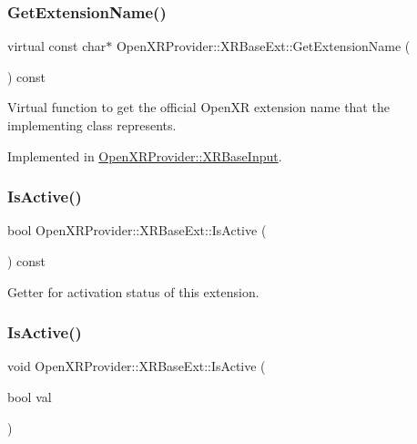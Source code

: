 \subsubsection{\texorpdfstring{GetExtensionName()}{GetExtensionName()}}
{\footnotesize\ttfamily virtual const char$\ast$ Open\+X\+R\+Provider\+::\+X\+R\+Base\+Ext\+::\+Get\+Extension\+Name (\begin{DoxyParamCaption}{ }\end{DoxyParamCaption}) const\hspace{0.3cm}{\ttfamily [pure virtual]}}



Virtual function to get the official Open\+XR extension name that the implementing class represents. 



Implemented in \mbox{\hyperlink{class_open_x_r_provider_1_1_x_r_base_input_a139c33cb927e7b85970d66d35f76e154}{Open\+X\+R\+Provider\+::\+X\+R\+Base\+Input}}.

\mbox{\label{class_open_x_r_provider_1_1_x_r_base_ext_a40bce34f078349e639139ea85b630ac3}} 
\subsubsection{\texorpdfstring{IsActive()}{IsActive()}\hspace{0.1cm}{\footnotesize\ttfamily [1/2]}}
{\footnotesize\ttfamily bool Open\+X\+R\+Provider\+::\+X\+R\+Base\+Ext\+::\+Is\+Active (\begin{DoxyParamCaption}{ }\end{DoxyParamCaption}) const\hspace{0.3cm}{\ttfamily [inline]}}



Getter for activation status of this extension. 

\mbox{\label{class_open_x_r_provider_1_1_x_r_base_ext_a19dd6d3922ebeb2f64402f2dcc23245b}} 
\subsubsection{\texorpdfstring{IsActive()}{IsActive()}\hspace{0.1cm}{\footnotesize\ttfamily [2/2]}}
{\footnotesize\ttfamily void Open\+X\+R\+Provider\+::\+X\+R\+Base\+Ext\+::\+Is\+Active (\begin{DoxyParamCaption}\item[{bool}]{val }\end{DoxyParamCaption})\hspace{0.3cm}{\ttfamily [inline]}}



